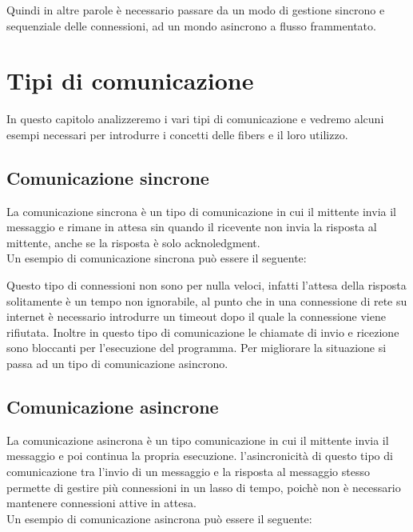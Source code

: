 \documentclass[10pt,a4paper,italian]{report}
\begin{document}
\noindent Quindi in altre parole è necessario passare da un modo di gestione sincrono e sequenziale delle connessioni, ad un mondo asincrono a flusso frammentato.

\chapter{Tipi di comunicazione}
\noindent In questo capitolo analizzeremo i vari tipi di comunicazione e vedremo alcuni esempi necessari per introdurre i concetti delle fibers e il loro utilizzo.

\section{Comunicazione sincrone}
\noindent La comunicazione sincrona è un tipo di comunicazione in cui il mittente invia il messaggio e rimane in attesa sin quando il ricevente non invia la risposta al mittente, anche se la risposta è solo acknoledgment.
\\
Un esempio di comunicazione sincrona può essere il seguente:



\noindent Questo tipo di connessioni non sono per nulla veloci, infatti l'attesa della risposta solitamente è un tempo non ignorabile, al punto che in una connessione di rete su internet è necessario introdurre un timeout dopo il quale la connessione viene rifiutata. Inoltre in questo tipo di comunicazione le chiamate di invio e ricezione sono bloccanti per l'esecuzione del programma. Per migliorare la situazione si passa ad un tipo di comunicazione asincrono.

\section{Comunicazione asincrone}
\noindent La comunicazione asincrona è un tipo comunicazione in cui il mittente invia il messaggio e poi continua la propria esecuzione. l'asincronicità di questo tipo di comunicazione tra l'invio di un messaggio e la risposta al messaggio stesso permette di gestire più connessioni in un lasso di tempo, poichè non è necessario mantenere connessioni attive in attesa.\\

\noindent Un esempio di comunicazione asincrona può essere il seguente:


\end{document}

